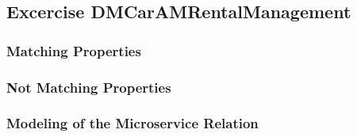 \subsection{Excercise DMCarAMRentalManagement}
\subsubsection*{Matching Properties}
\subsubsection*{Not Matching Properties}
\subsubsection*{Modeling of the Microservice Relation}